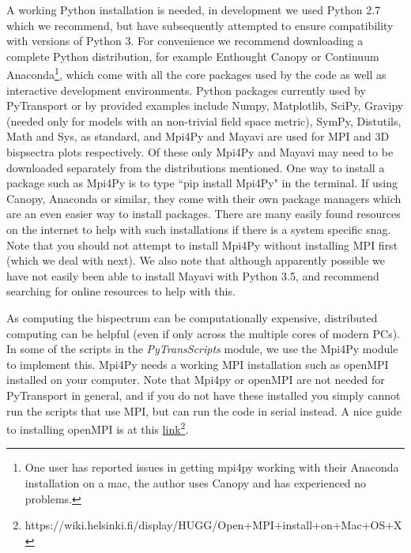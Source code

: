 \documentclass[10pt,
amsmath,amssymb,
aps,prd,nofootinbib,eqsecnum,a4paper]{revtex4}
\begin{document}
\vspace{0.2cm}
  A working Python installation is needed, in development we used Python 2.7 which we recommend, 
but have subsequently attempted to ensure compatibility with versions of Python 3. 
For convenience we recommend downloading a complete Python distribution, for  
  example Enthought Canopy or Continuum Anaconda\footnote{One user has reported issues in getting mpi4py working with 
  their Anaconda installation on a mac, the author uses Canopy and has experienced no problems.}, which 
  come with all the core packages used by the code as well as 
  interactive development environments.
  Python packages currently used by PyTransport or by provided examples include Numpy, Matplotlib, SciPy, 
  Gravipy (needed only for 
  models with an non-trivial field space metric), SymPy, Distutils, Math and Sys, 
  as standard, and Mpi4Py and Mayavi are used 
  for MPI and 3D bispsectra plots respectively. Of these only Mpi4Py and Mayavi may 
  need to be downloaded separately from the distributions mentioned. One way to install a package 
  such as Mpi4Py is to type 
 ``pip install Mpi4Py" in the terminal. If using Canopy, Anaconda or similar, they come with their 
 own package managers  which are an even easier way to install packages. 
 There are many 
 easily found resources on the internet to help with such installations if there is a system 
 specific snag. Note that you should not attempt to install Mpi4Py without installing MPI first (which we deal with next). We also note that although apparently possible we have not easily been able to install Mayavi with Python 3.5, and recommend searching for online resources to help with this.

\vspace{0.2cm}
As computing the bispectrum can be computationally expensive, distributed computing can be helpful 
(even if only across the multiple cores of modern PCs). 
In some of the scripts in the 
{\it PyTransScripts} module,  
we use the Mpi4Py module to implement this. Mpi4Py needs a working MPI installation such as 
openMPI installed on your 
computer. Note that Mpi4py or openMPI are not needed for 
PyTransport in general, and if you do not have these installed you simply  
cannot run the scripts that use MPI, but can run the code in serial instead. A nice guide to installing openMPI is 
at this \href{https://wiki.helsinki.fi/display/HUGG/Open+MPI+install+on+Mac+OS+X}{link}\footnote{https://wiki.helsinki.fi/display/HUGG/Open+MPI+install+on+Mac+OS+X}.
\end{document}
